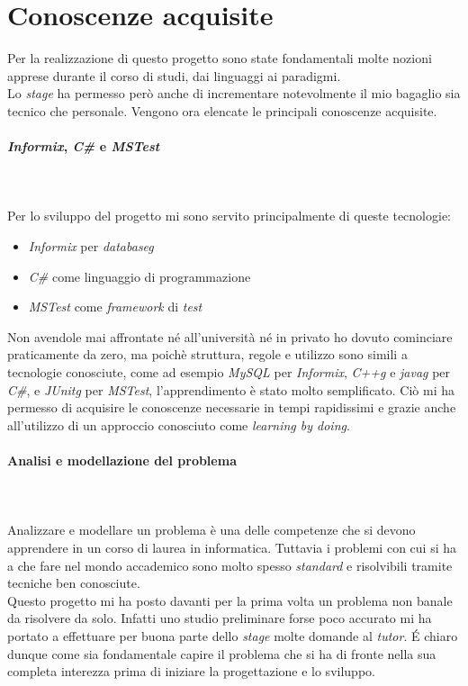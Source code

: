 \section{Conoscenze acquisite}
\noindent Per la realizzazione di questo progetto sono state fondamentali
molte nozioni apprese durante il corso di studi, dai linguaggi ai paradigmi.\\
Lo \textit{stage} ha permesso però anche di incrementare notevolmente il mio bagaglio
sia tecnico che personale.
Vengono ora elencate le principali conoscenze acquisite.
\paragraph{\textit{Informix}, \textit{C\#} e \textit{MSTest}}\hfill\\\\
\noindent Per lo sviluppo del progetto mi sono servito principalmente di queste tecnologie:
\begin{itemize}
    \item \textit{Informix} per \textit{\gls{databaseg}}
    \item \textit{C\#} come linguaggio di programmazione
    \item \textit{MSTest} come \textit{framework} di \textit{test}
\end{itemize}
\noindent Non avendole mai affrontate né all’università né in privato ho dovuto
cominciare praticamente da zero, ma poichè struttura, regole e utilizzo sono simili
a tecnologie conosciute, come ad esempio \textit{MySQL} per \textit{Informix}, \textit{\gls{C++g}} e \textit{\gls{javag}} per \textit{C\#},
e \textit{\gls{JUnitg}} per \textit{MSTest}, l’apprendimento è stato molto semplificato.
Ciò mi ha permesso di acquisire le conoscenze necessarie in tempi rapidissimi
e grazie anche all'utilizzo di un approccio conosciuto come \textit{learning
by doing}.
\paragraph{Analisi e modellazione del problema}\hfill\\\\
Analizzare e modellare un problema è una delle competenze che si devono apprendere
in un corso di laurea in informatica. Tuttavia i problemi con cui si ha a che fare
nel mondo accademico sono molto spesso \textit{standard} e risolvibili tramite tecniche
ben conosciute.\\
Questo progetto mi ha posto davanti per la prima volta un problema
non banale da risolvere da solo. Infatti uno studio preliminare forse poco accurato
mi ha portato a effettuare per buona parte dello \textit{stage} molte domande al \textit{tutor}.
É chiaro dunque come sia fondamentale capire il problema che si ha di fronte nella
sua completa interezza prima di iniziare la progettazione e lo sviluppo.

